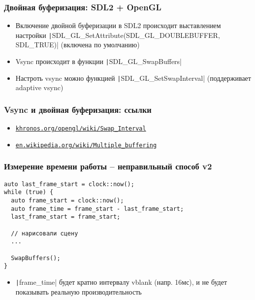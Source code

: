 \documentclass{beamer}
\begin{document}
\begin{frame}[fragile]
\frametitle{Двойная буферизация: SDL2 + OpenGL}
\begin{itemize}
\item Включение двойной буферизации в SDL2 происходит выставлением настройки \texttt|SDL_GL_SetAttribute(SDL_GL_DOUBLEBUFFER, SDL_TRUE)| (включена по умолчанию)
\pause
\item Vsync происходит в функции \texttt|SDL_GL_SwapBuffers|
\pause
\item Настроть vsync можно функцией \texttt|SDL_GL_SetSwapInterval| (поддерживает adaptive vsync)
\end{itemize}
\end{frame}

\begin{frame}[fragile]
\frametitle{Vsync и двойная буферизация: ссылки}
\begin{itemize}
\item \href{https://www.khronos.org/opengl/wiki/Swap_Interval}{\texttt{khronos.org/opengl/wiki/Swap\_Interval}}
\item \href{https://en.wikipedia.org/wiki/Multiple_buffering#Double_buffering_in_computer_graphics}{\texttt{en.wikipedia.org/wiki/Multiple\_buffering}}
\end{itemize}
\end{frame}

\begin{frame}[fragile]
\frametitle{Измерение времени работы -- неправильный способ v2}
\begin{verbatim}
auto last_frame_start = clock::now();
while (true) {
  auto frame_start = clock::now();
  auto frame_time = frame_start - last_frame_start;
  last_frame_start = frame_start;

  // нарисовали сцену
  ...

  SwapBuffers();
}
\end{verbatim}
\vspace*{-1cm}
\pause
\begin{itemize}
\item \texttt|frame_time| будет кратно интервалу vblank (напр. 16мс), и не будет показывать реальную производительность
\end{itemize}
\end{frame}
\end{document}
